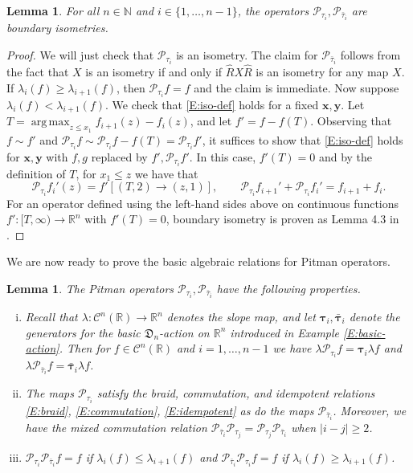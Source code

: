 \documentclass[11pt]{article}
\newcommand{\N}{\mathbb{N}}
\newcommand{\R}{\mathbb{R}}
\newcommand{\la}{\lambda}
\newcommand{\cC}{\mathcal{C}}
\newcommand{\cP}{\mathcal{P}}
\DeclareMathOperator*{\argmax}{arg\,max}
\newcommand{\bx}{\mathbf{x}}
\newcommand{\by}{\mathbf{y}}
\newtheorem{lemma}[theorem]{Lemma}
\theoremstyle{definition} %
\theoremstyle{remark} %
\newcommand{\btau}{{\boldsymbol \tau}}
\newcommand{\bbtau}{\bar {\boldsymbol \tau}}
\begin{document}
\begin{lemma}
\label{L:two-line-isometry}
For all $n \in \N$ and $i \in \{1, \dots, n-1\}$, the operators $\cP_{\tau_i}, \cP_{\bar \tau_i}$ are boundary isometries.
\end{lemma}


\begin{proof} 
We will just check that $\cP_{\tau_i}$ is an isometry. The claim for $\cP_{\bar \tau_i}$ follows from the fact that $X$ is an isometry if and only if $\hat R X \hat R$ is an isometry for any map $X$. If $\la_i(f) \ge \la_{i+1}(f)$, then $\cP_{\tau_i} f = f$ and the claim is immediate. Now suppose $\la_i(f) < \la_{i+1}(f)$. We check that \eqref{E:iso-def} holds for a fixed $\bx, \by$. Let $T = \argmax_{z \le x_1} f_{i+1}(z) - f_i(z)$, and let $f' = f - f(T)$. Observing that $f \sim f'$ and $\cP_{\tau_i} f \sim \cP_{\tau_i} f - f(T) = \cP_{\tau_i} f'$, it suffices to show that \eqref{E:iso-def} holds for $\bx, \by$ with $f, g$ replaced by $f', \cP_{\tau_i} f'$. In this case, $f'(T) = 0$ and by the definition of $T$, for $x_1 \le z$ we have that
$$
\cP_{\tau_i} f_i'(z) = f'[(T, 2) \to (z, 1)], \qquad \cP_{\tau_i} f_{i+1}' + \cP_{\tau_i} f_i' = f_{i+1} + f_i.
$$
For an operator defined using the left-hand sides above on continuous functions $f':[T, \infty) \to \R^n$ with $f'(T) = 0$, boundary isometry is proven as Lemma 4.3 in \cite{DOV}.
\end{proof}

We are now ready to prove the basic algebraic relations for Pitman operators.
\begin{lemma}
	\label{L:Pitman-properties}
	The Pitman operators $\cP_{\tau_i}, \cP_{\bar \tau_i}$ have the following properties.
	\begin{enumerate}[i.]
		\item Recall that $\la:\cC^n(\R) \to \R^n$ denotes the slope map, and let $\btau_i, \bbtau_i$ denote the generators for the basic $\mathfrak{D}_n$-action on $\R^n$ introduced in Example \ref{E:basic-action}.
		Then for $f \in \cC^n(\R)$ and $i = 1, \dots, n-1$ we have $\la \cP_{\tau_i} f = \btau_i \la f$ and $\la \cP_{\bar \tau_i} f = \bbtau_i \la f$.
		\item The maps $\cP_{\tau_i}$ satisfy the braid, commutation, and idempotent relations \eqref{E:braid}, \eqref{E:commutation}, \eqref{E:idempotent} as do the maps $\cP_{\bar \tau_i}$. Moreover, we have the mixed commutation relation $\cP_{\bar \tau_i} \cP_{\tau_j} = \cP_{\tau_j} \cP_{\bar \tau_i}$ when $|i-j| \ge 2$.
		\item $\cP_{\tau_i}\cP_{\bar \tau_i} f = f$ if $\la_i(f) \le \la_{i+1}(f)$ and $\cP_{\bar \tau_i}\cP_{\tau_i} f = f$ if $\la_i(f) \ge \la_{i+1}(f)$.
	\end{enumerate}
\end{lemma}
\end{document}
